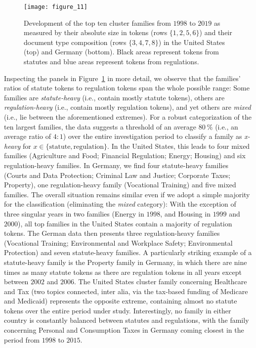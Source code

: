 \begin{figure}
	\centering
	\vspace*{-9pt}\texttt{[image: figure\_11]}
	\caption{Development of the top ten cluster families from $1998$ to $2019$ as measured by their absolute size in tokens (rows $\{1,2,5,6\}$) and their document type composition (rows $\{3,4,7,8\}$) in the United States (top) and Germany (bottom).
	Black areas represent tokens from statutes and blue areas represent tokens from regulations.}\label{fig:families}
\end{figure}

Inspecting the panels in Figure~\ref{fig:families} in more detail, we observe that the families' ratios of statute tokens to regulation tokens span the whole possible range: 
Some families are \emph{statute-heavy} (i.e., contain mostly statute tokens), 
others are \emph{regulation-heavy} (i.e., contain mostly regulation tokens),
and yet others are \emph{mixed} (i.e., lie between the aforementioned extremes).
For a robust categorization of the ten largest families, the data suggests a threshold of an average $80~\%$ (i.e., an average ratio of $4:1$) over the entire investigation period to classify a family as \emph{x-heavy} for $x\in\{\text{statute}, \text{regulation}\}$.
In the United States, this leads to four mixed families (Agriculture and Food; Financial Regulation; Energy; Housing) and six regulation-heavy families.
In Germany, we find four statute-heavy families (Courts and Data Protection; Criminal Law and Justice; Corporate Taxes; Property), one regulation-heavy family (Vocational Training) and five mixed families.
The overall situation remains similar even if we adopt a simple majority for the classification (eliminating the \emph{mixed} category): 
With the exception of three singular years in two families (Energy in $1998$, and Housing in $1999$ and $2000$), all top families in the United States contain a majority of regulation tokens.
The German data then presents three regulation-heavy families (Vocational Training; Environmental and Workplace Safety; Environmental Protection) and seven statute-heavy families.
A particularly striking example of a statute-heavy family is the Property family in Germany, in which there are nine times as many statute tokens as there are regulation tokens in all years except between $2002$ and $2006$.
The United States cluster family concerning Healthcare and Tax (two topics connected, inter alia, via the tax-based funding of Medicare and Medicaid) represents the opposite extreme, containing almost no statute tokens over the entire period under study.
Interestingly, no family in either country is constantly balanced between statutes and regulations, with the family concerning Personal and Consumption Taxes in Germany coming closest in the period from $1998$ to $2015$.

